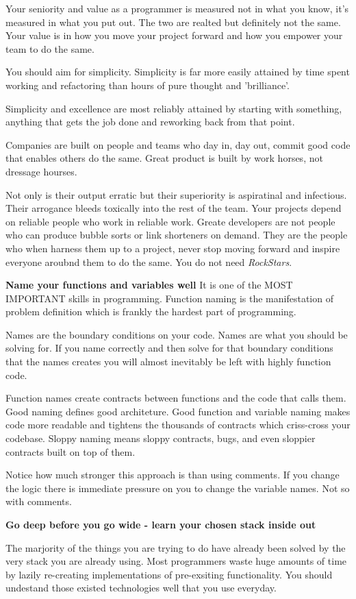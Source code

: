 Your seniority and value as a programmer is measured not in what you know,
it's measured in what you put out.
The two are realted but definitely not the same.
Your value is in how you move your project forward and 
how you empower your team to do the same.

You should aim for simplicity.
Simplicity is far more easily attained by time spent working and refactoring than hours of pure thought and 'brilliance'.

Simplicity and excellence are most reliably attained by starting with something, 
anything that gets the job done and reworking back from that point.

Companies are built on people and teams who day in, day out, 
commit good code that enables others do the same.
Great product is built by work horses, not dressage hourses.

Not only is their output erratic but their superiority is aspiratinal and infectious.
Their arrogance bleeds toxically into the rest of the team.
Your projects depend on reliable people who work in reliable work.
Greate developers are not people who can produce bubble sorts or link shorteners on demand.
They are the people who when harness them up to a project,
never stop moving forward and inspire everyone aroubnd them to do the same.
You do not need {\it RockStars}.

{\bf Name your functions and variables well} \newline
It is one of the MOST IMPORTANT skills in programming.
Function naming is the manifestation of problem definition 
which is frankly the hardest part of programming.

Names are the boundary conditions on your code. 
Names are what you should be solving for.
If you name correctly and then solve for that boundary conditions 
that the names creates you will almost inevitably be left with highly function code.

Function names create contracts between functions and the code that calls them.
Good naming defines good architeture.
Good function and variable naming makes code more readable and tightens the thousands of contracts which criss-cross your codebase.
Sloppy naming means sloppy contracts, bugs, and even sloppier contracts built on top of them.

Notice how much stronger this approach is than using comments.
If you change the logic there is immediate pressure on you to change the variable names.
Not so with comments.

{\bf Go deep before you go wide - learn your chosen stack inside out} 
\par 
The marjority of the things you are trying to do have already been solved by the very stack you are already using.
Most programmers waste huge amounts of time by lazily re-creating implementations of pre-exsiting functionality.
You should undestand those existed technologies well that you use everyday.


